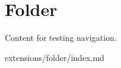 
\section{\label{folder}Folder}
\par Content for testing navigation.
\par extensions/folder/index.md
